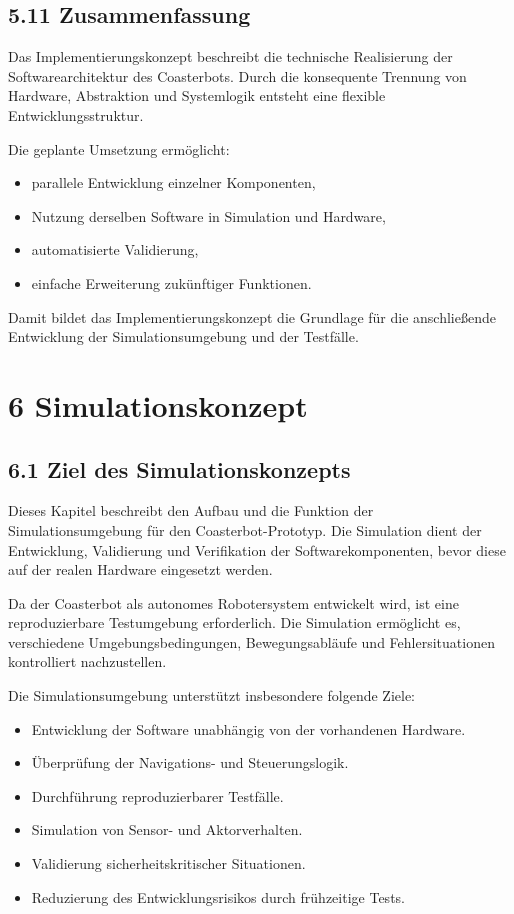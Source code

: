 \documentclass[
]{article}
\providecommand{\tightlist}{%
  \setlength{\itemsep}{0pt}\setlength{\parskip}{0pt}}
\begin{document}
\subsection{5.11 Zusammenfassung}\label{zusammenfassung-3}

Das Implementierungskonzept beschreibt die technische Realisierung der
Softwarearchitektur des Coasterbots. Durch die konsequente Trennung von
Hardware, Abstraktion und Systemlogik entsteht eine flexible
Entwicklungsstruktur.

Die geplante Umsetzung ermöglicht:

\begin{itemize}
\tightlist
\item
  parallele Entwicklung einzelner Komponenten,
\item
  Nutzung derselben Software in Simulation und Hardware,
\item
  automatisierte Validierung,
\item
  einfache Erweiterung zukünftiger Funktionen.
\end{itemize}

Damit bildet das Implementierungskonzept die Grundlage für die
anschließende Entwicklung der Simulationsumgebung und der Testfälle.

\section{6 Simulationskonzept}\label{simulationskonzept}

\subsection{6.1 Ziel des
Simulationskonzepts}\label{ziel-des-simulationskonzepts}

Dieses Kapitel beschreibt den Aufbau und die Funktion der
Simulationsumgebung für den Coasterbot-Prototyp. Die Simulation dient
der Entwicklung, Validierung und Verifikation der Softwarekomponenten,
bevor diese auf der realen Hardware eingesetzt werden.

Da der Coasterbot als autonomes Robotersystem entwickelt wird, ist eine
reproduzierbare Testumgebung erforderlich. Die Simulation ermöglicht es,
verschiedene Umgebungsbedingungen, Bewegungsabläufe und
Fehlersituationen kontrolliert nachzustellen.

Die Simulationsumgebung unterstützt insbesondere folgende Ziele:

\begin{itemize}
\tightlist
\item
  Entwicklung der Software unabhängig von der vorhandenen Hardware.
\item
  Überprüfung der Navigations- und Steuerungslogik.
\item
  Durchführung reproduzierbarer Testfälle.
\item
  Simulation von Sensor- und Aktorverhalten.
\item
  Validierung sicherheitskritischer Situationen.
\item
  Reduzierung des Entwicklungsrisikos durch frühzeitige Tests.
\end{itemize}
\end{document}
